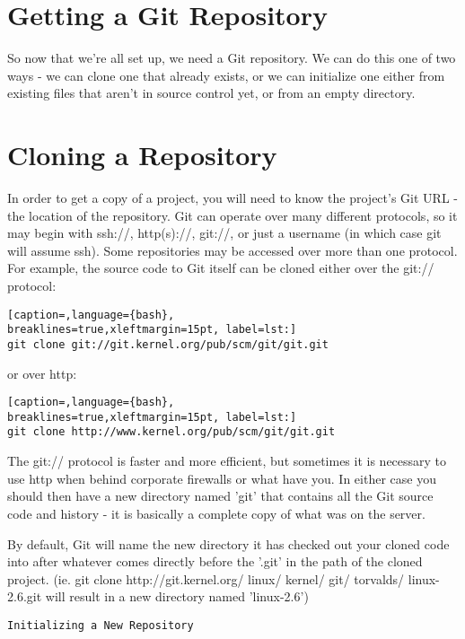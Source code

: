 \section{Getting a Git Repository}
So now that we're all set up, we need a Git repository. We can do this one of
two ways - we can clone one that already exists, or we can initialize one
either from existing files that aren't in source control yet, or from an empty
directory.

\section{Cloning a Repository}
In order to get a copy of a project, you will need to know the project's Git
URL - the location of the repository. Git can operate over many different
protocols, so it may begin with ssh://, http(s)://, git://, or just a username
(in which case git will assume ssh). Some repositories may be accessed over
more than one protocol. For example, the source code to Git itself can be
cloned either over the git:// protocol:
\lstset{basicstyle=\scriptsize, numbers=none, captionpos=b, tabsize=4}
\begin{lstlisting}[caption=,language={bash},
breaklines=true,xleftmargin=15pt, label=lst:]
git clone git://git.kernel.org/pub/scm/git/git.git
\end{lstlisting}

or over http:
\lstset{basicstyle=\scriptsize, numbers=none, captionpos=b, tabsize=4}
\begin{lstlisting}[caption=,language={bash},
breaklines=true,xleftmargin=15pt, label=lst:]
git clone http://www.kernel.org/pub/scm/git/git.git
\end{lstlisting}

The git:// protocol is faster and more efficient, but sometimes it is necessary
to use http when behind corporate firewalls or what have you. In either case
you should then have a new directory named 'git' that contains all the Git
source code and history - it is basically a complete copy of what was on the
server.

By default, Git will name the new directory it has checked out your cloned code
into after whatever comes directly before the '.git' in the path of the cloned
project. (ie. git clone http://git.kernel.org/ linux/ kernel/ git/ torvalds/
linux-2.6.git will result in a new directory named 'linux-2.6')
\scriptsize
\begin{verbatim}
Initializing a New Repository
\end{verbatim}
\normalsize

